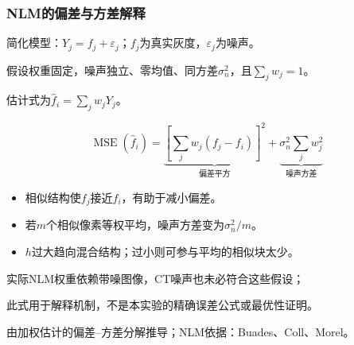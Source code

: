 \documentclass[11pt,aspectratio=169]{beamer}
\newcommand{\source}[1]{\vfill{\fontsize{7.5}{9}\selectfont\color{Muted}#1\par}}
\begin{document}
\begin{frame}
\frametitle{NLM的偏差与方差解释}
{\small 简化模型：$Y_j=f_j+\varepsilon_j$；$f_j$为真实灰度，$\varepsilon_j$为噪声。\par
假设权重固定，噪声独立、零均值、同方差$\sigma_n^2$，且$\sum_jw_j=1$。\par
估计式为$\widehat f_i=\sum_jw_jY_j$。}\par
\[
\operatorname{MSE}(\widehat f_i)=
\underbrace{\left[\sum_jw_j(f_j-f_i)\right]^2}_{\text{偏差平方}}
+\underbrace{\sigma_n^2\sum_jw_j^2}_{\text{噪声方差}}
\]
\begin{itemize}
\item 相似结构使$f_j$接近$f_i$，有助于减小偏差。
\item 若$m$个相似像素等权平均，噪声方差变为$\sigma_n^2/m$。
\item $h$过大趋向混合结构；过小则可参与平均的相似块太少。
\end{itemize}
{\small 实际NLM权重依赖带噪图像，CT噪声也未必符合这些假设；\par
此式用于解释机制，不是本实验的精确误差公式或最优性证明。}
\source{由加权估计的偏差--方差分解推导；NLM依据：Buades、Coll、Morel。}
\end{frame}
\end{document}
